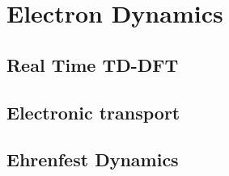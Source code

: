 \chapter{Electron Dynamics}

\section{Real Time TD-DFT}

\section{Electronic transport}

\section{Ehrenfest Dynamics}

